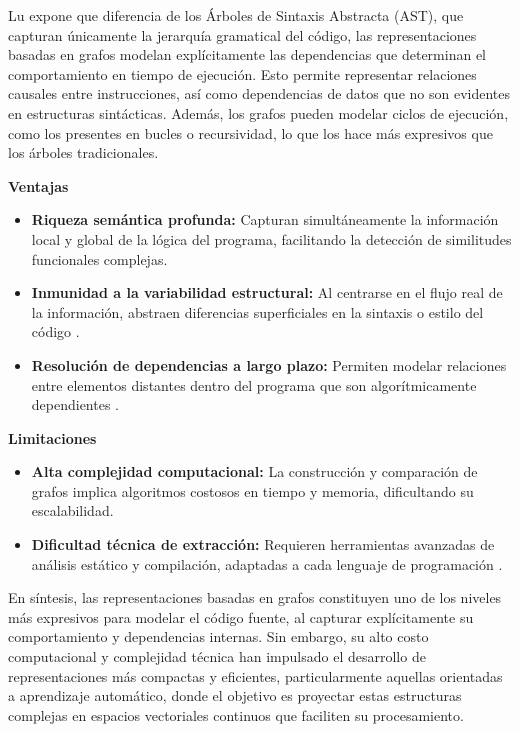 Lu \cite{Lu2026CSSG} expone que diferencia de los Árboles de Sintaxis Abstracta (AST), que capturan únicamente la jerarquía gramatical del código, las representaciones basadas en grafos modelan explícitamente las dependencias que determinan el comportamiento en tiempo de ejecución. Esto permite representar relaciones causales entre instrucciones, así como dependencias de datos que no son evidentes en estructuras sintácticas. Además, los grafos pueden modelar ciclos de ejecución, como los presentes en bucles o recursividad, lo que los hace más expresivos que los árboles tradicionales.

\textbf{Ventajas}
\begin{itemize}
    \item \textbf{Riqueza semántica profunda:} Capturan simultáneamente la información local y global de la lógica del programa, facilitando la detección de similitudes funcionales complejas.

    \item \textbf{Inmunidad a la variabilidad estructural:} Al centrarse en el flujo real de la información, abstraen diferencias superficiales en la sintaxis o estilo del código \cite{Yu2023Graph}.

    \item \textbf{Resolución de dependencias a largo plazo:} Permiten modelar relaciones entre elementos distantes dentro del programa que son algorítmicamente dependientes \cite{Guo2021GraphCodeBERT}.
\end{itemize}

\textbf{Limitaciones}
\begin{itemize}
    \item \textbf{Alta complejidad computacional:} La construcción y comparación de grafos implica algoritmos costosos en tiempo y memoria, dificultando su escalabilidad.

    \item \textbf{Dificultad técnica de extracción:} Requieren herramientas avanzadas de análisis estático y compilación, adaptadas a cada lenguaje de programación \cite{Yu2023Graph}.
\end{itemize}

En síntesis, las representaciones basadas en grafos constituyen uno de los niveles más expresivos para modelar el código fuente, al capturar explícitamente su comportamiento y dependencias internas. Sin embargo, su alto costo computacional y complejidad técnica han impulsado el desarrollo de representaciones más compactas y eficientes, particularmente aquellas orientadas a aprendizaje automático, donde el objetivo es proyectar estas estructuras complejas en espacios vectoriales continuos que faciliten su procesamiento.

